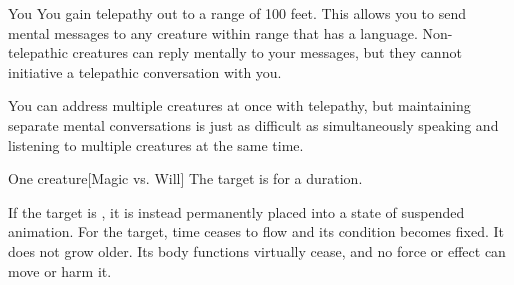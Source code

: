 \begin{spellheader}
    \spelldur{\durlong}
\end{spellheader}
\begin{spelleffects}
    \begin{spelltarget}{You}
        \spelleffect You gain telepathy out to a range of 100 feet. This allows you to send mental messages to any creature within range that has a language. Non-telepathic creatures can reply mentally to your messages, but they cannot initiative a telepathic conversation with you.

        You can address multiple creatures at once with telepathy, but maintaining separate mental conversations is just as difficult as simultaneously speaking and listening to multiple creatures at the same time. 
    \end{spelltarget}
\end{spelleffects}
\begin{spellfooter}
    
\end{spellfooter}

\begin{spellheader}
\end{spellheader}
\begin{spelleffects}
    \begin{spelltarget}{One creature}[Magic vs. Will]
        \spellsuccess The target is \slowed for a \durlong duration.

        If the target is \bloodied, it is instead permanently placed into a state of suspended animation. For the target, time ceases to flow and its condition becomes fixed. It does not grow older. Its body functions virtually cease, and no force or effect can move or harm it.
    \end{spelltarget}
\end{spelleffects}
\begin{spellfooter}
    
\end{spellfooter}


